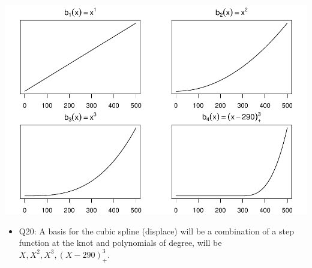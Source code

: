 \documentclass[]{article}
\providecommand{\tightlist}{%
  \setlength{\itemsep}{0pt}\setlength{\parskip}{0pt}}
\begin{document}
\includegraphics{Project2_files/figure-latex/unnamed-chunk-9-2.pdf}

\begin{itemize}
\tightlist
\item
  Q20: A basis for the cubic spline (displace) will be a combination of
  a step function at the knot and polynomials of degree, will be
  \(X, X^2, X^3, (X-290)^3_+\).
\end{itemize}
\end{document}
